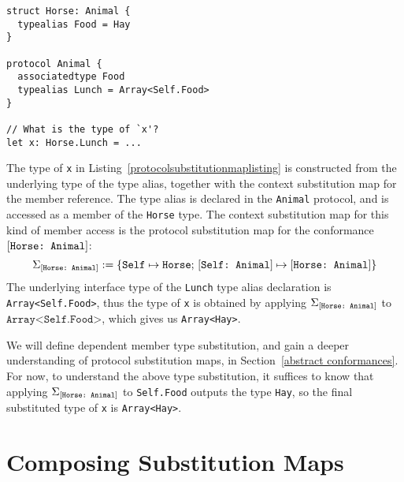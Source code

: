 \documentclass[../generics]{subfiles}
\begin{document}
\begin{listing}\label{protocolsubstitutionmaplisting}
\begin{Verbatim}
struct Horse: Animal {
  typealias Food = Hay
}

protocol Animal {
  associatedtype Food
  typealias Lunch = Array<Self.Food>
}

// What is the type of `x'?
let x: Horse.Lunch = ...
\end{Verbatim}
\end{listing}
\begin{example} The type of \texttt{x} in Listing~\ref{protocolsubstitutionmaplisting} is constructed from the underlying type of the type alias, together with the context substitution map for the member reference. The type alias is declared in the \texttt{Animal} protocol, and is accessed as a member of the \texttt{Horse} type. The context substitution map for this kind of member access is the protocol substitution map for the conformance $[\texttt{Horse:~Animal}]$:
\[
\Sigma_{[\texttt{Horse:~Animal}]} := \{
\texttt{Self} \mapsto \texttt{Horse}
;\,
[\texttt{Self:~Animal}] \mapsto [\texttt{Horse:~Animal}]
\}
\]
The underlying interface type of the \texttt{Lunch} type alias declaration is \texttt{Array<Self.Food>}, thus the type of \texttt{x} is obtained by applying $\Sigma_{[\texttt{Horse:~Animal}]}$ to $\texttt{Array<Self.Food>}$, which gives us \texttt{Array<Hay>}.

We will define dependent member type substitution, and gain a deeper understanding of protocol substitution maps, in Section~\ref{abstract conformances}. For now, to understand the above type substitution, it suffices to know that applying $\Sigma_{[\texttt{Horse:~Animal}]}$ to \texttt{Self.Food} outputs the type \texttt{Hay}, so the final substituted type of \texttt{x} is \texttt{Array<Hay>}. 
\end{example}

\section{Composing Substitution Maps}\label{submapcomposition}
\end{document}
